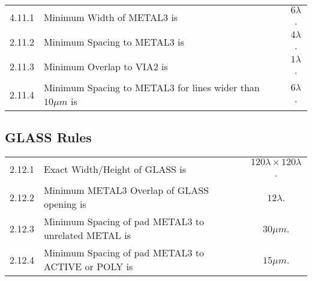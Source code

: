 \begin{flushleft}
    \begin{tabular}{c l c}
        4.11.1  & Minimum Width of METAL3 is & $6 \lambda$. \\
        2.11.2  & Minimum Spacing to METAL3 is & $4 \lambda$. \\
        2.11.3  & Minimum Overlap to VIA2 is & $1 \lambda$. \\
        2.11.4  & Minimum Spacing to METAL3 for lines wider than $10 \mu m$ is & $6 \lambda$. \\
    \end{tabular}
\end{flushleft}

\subsection{GLASS Rules}\label{design_rules_glass_rules}

\begin{flushleft}
    \begin{tabular}{c l c}
	2.12.1  & Exact Width/Height of GLASS is & $ 120 \lambda \times 120 \lambda$. \\
        2.12.2  & Minimum METAL3 Overlap of GLASS opening is & $ 12 \lambda $. \\
        2.12.3  & Minimum Spacing of pad METAL3 to unrelated METAL is & $30 \mu m$. \\
        2.12.4  & Minimum Spacing of pad METAL3 to ACTIVE or POLY is & $15 \mu m$. \\
    \end{tabular}
\end{flushleft}


